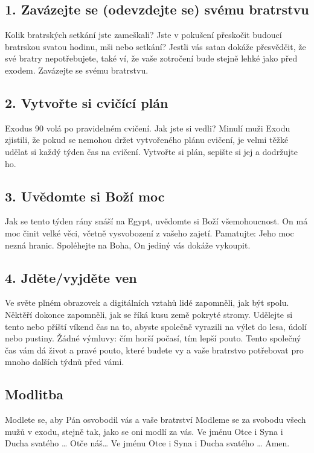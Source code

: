 \documentclass[11pt]{article}
\begin{document}
\subsection*{1. Zavázejte se (odevzdejte se) svému bratrstvu}
Kolik bratrských setkání jste zameškali? Jste v pokušení přeskočit budoucí bratrskou svatou hodinu, mši nebo setkání? Jestli vás satan dokáže přesvědčit, že své bratry nepotřebujete, také ví, že vaše zotročení bude stejně lehké jako před exodem. Zavázejte se svému bratrstvu.
\subsection*{2. Vytvořte si cvičící plán}
Exodus 90 volá po pravidelném cvičení. Jak jste si vedli? Minulí muži Exodu zjistili, že pokud se nemohou držet vytvořeného plánu cvičení, je velmi těžké udělat si každý týden čas na cvičení. Vytvořte si plán, sepište si jej a dodržujte ho.
\subsection*{3. Uvědomte si Boží moc}
Jak se tento týden rány snáší na Egypt, uvědomte si Boží všemohoucnost. On má moc činit velké věci, včetně vysvobození z vašeho zajetí. Pamatujte: Jeho moc nezná hranic. Spoléhejte na Boha, On jediný vás dokáže vykoupit.
\subsection*{4. Jděte/vyjděte ven}
Ve světe plném obrazovek a digitálních vztahů lidé zapomněli, jak být spolu. Něktěří dokonce zapomněli, jak se říká kusu země pokryté stromy. Udělejte si tento nebo příští víkend čas na to, abyste společně vyrazili na výlet do lesa, údolí nebo pustiny. Žádné výmluvy: čím horší počasí, tím lepší pouto. Tento společný čas vám dá život a pravé pouto, které budete vy a vaše bratrstvo potřebovat pro mnoho dalších týdnů před vámi.

\subsection*{Modlitba}
Modlete se, aby Pán osvobodil vás a vaše bratrství \newline
Modleme se za svobodu všech mužů v exodu, stejně tak, jako se oni modlí za vás.\newline
Ve jménu Otce i Syna i Ducha svatého … Otče náš… Ve jménu Otce i Syna i Ducha svatého … Amen.

\newpage
\end{document}
